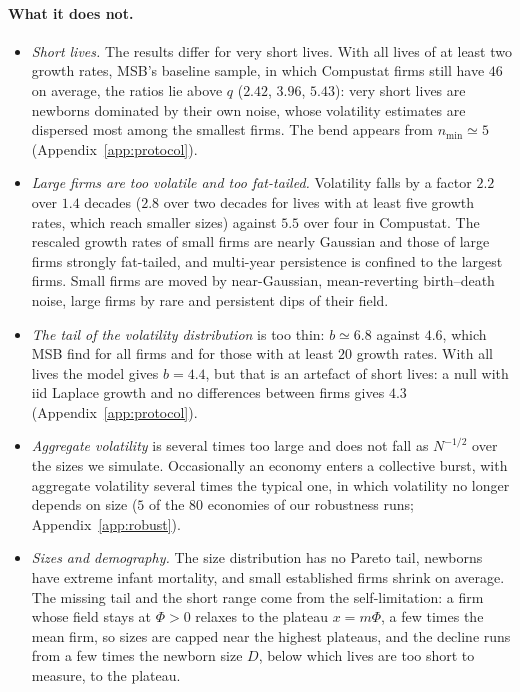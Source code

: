 \documentclass[pre,twocolumn,superscriptaddress,nofootinbib]{revtex4-2}
\begin{document}
\paragraph{What it does not.}
\begin{itemize}
\item \emph{Short lives.}  The results differ for very short lives.  With all lives of at least two
  growth rates, MSB's baseline sample, in which Compustat firms still have $46$ on average, the
  ratios lie above $q$ ($2.42$, $3.96$, $5.43$): very short lives are newborns dominated by their own
  noise, whose volatility estimates are dispersed most among the smallest firms.  The bend appears
  from $n_{\min}\simeq5$ (Appendix~\ref{app:protocol}).
\item \emph{Large firms are too volatile and too fat-tailed.}  Volatility falls by a factor $2.2$
  over $1.4$ decades ($2.8$ over two decades for lives with at least five growth rates, which reach
  smaller sizes) against $5.5$ over four in Compustat.  The rescaled growth rates of small firms
  are nearly Gaussian and those of large firms strongly fat-tailed, and multi-year persistence is
  confined to the largest firms.  Small firms are moved by near-Gaussian, mean-reverting birth--death
  noise, large firms by rare and persistent dips of their field.
\item \emph{The tail of the volatility distribution} is too thin: $b\simeq6.8$ against $4.6$, which MSB
  find for all firms and for those with at least $20$ growth rates.  With all lives the model gives
  $b=4.4$, but that is an artefact of short lives: a null with iid Laplace growth and no differences
  between firms gives $4.3$ (Appendix~\ref{app:protocol}).
\item \emph{Aggregate volatility} is several times too large and does not fall as $N^{-1/2}$ over the
  sizes we simulate.  Occasionally an economy enters a collective burst, with aggregate volatility
  several times the typical one, in which volatility no longer depends on size ($5$ of the $80$
  economies of our robustness runs; Appendix~\ref{app:robust}).
\item \emph{Sizes and demography.}  The size distribution has no Pareto tail, newborns have extreme
  infant mortality, and small established firms shrink on average.  The missing tail and the short
  range come from the self-limitation: a firm whose field stays at $\Phi>0$ relaxes to the plateau
  $x=m\Phi$, a few times the mean firm, so sizes are capped near the highest plateaus, and the decline
  runs from a few times the newborn size $D$, below which lives are too short to measure, to the plateau.
\end{itemize}
\end{document}
